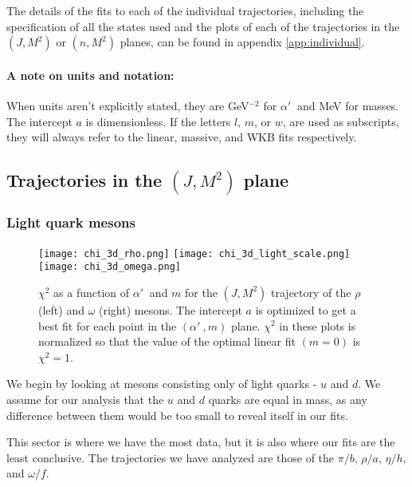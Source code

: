\documentclass[11pt,a4]{article}
\newcommand{\alp}{\ensuremath{\alpha'\:}}
\begin{document}
The details of the fits to each of the individual trajectories, including the specification of all the states used and the plots of each of the trajectories in the \((J,M^2)\) or \((n,M^2)\) planes, can be found in appendix \ref{app:individual}.

\paragraph{A note on units and notation:} When units aren't explicitly stated, they are GeV\(^{-2}\) for \(\alp\) and MeV for masses. The intercept \(a\) is dimensionless. If the letters \(l\), \(m\), or \(w\), are used as subscripts, they will always refer to the linear, massive, and WKB fits respectively.

\subsection{Trajectories in the \texorpdfstring{$(J,M^2)$}{(J,M2)} plane}
		\subsubsection{Light quark mesons}	

		\begin{figure}[t!] \centering %
						\texttt{[image: chi\_3d\_rho.png]}
						\texttt{[image: chi\_3d\_light\_scale.png]}
						\texttt{[image: chi\_3d\_omega.png]}
						\caption{\label{fig:chi_3d_light} \(\chi^2\) as a function of \(\alp\) and \(m\) for the \((J,M^2)\) trajectory of the \(\rho\)  (left) and \(\omega\) (right) mesons. The intercept \(a\) is optimized to get a best fit for each point in the \((\alp,m)\) plane. \(\chi^2\) in these plots is normalized so that the value of the optimal linear fit \((m=0)\) is \(\chi^2 = 1\).}
\end{figure}

			We begin by looking at mesons consisting only of light quarks - \(u\) and \(d\). We assume for our analysis that the \(u\) and \(d\) quarks are equal in mass, as any difference between them would be too small to reveal itself in our fits.

			This sector is where we have the most data, but it is also where our fits are the least conclusive. The trajectories we have analyzed are those of the \(\pi/b\), \(\rho/a\), \(\eta/h\), and \(\omega/f\).
			
\end{document}
